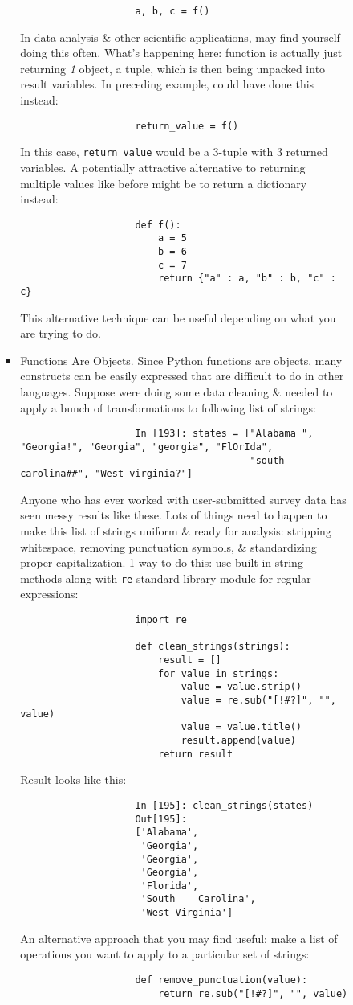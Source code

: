 \documentclass{article}
\begin{document}
\begin{enumerate}
\begin{itemize}
\begin{itemize}
\begin{itemize}
\begin{verbatim}
					a, b, c = f()
				\end{verbatim}
				In data analysis \& other scientific applications, may find yourself doing this often. What's happening here: function is actually just returning {\it1} object, a tuple, which is then being unpacked into result variables. In preceding example, could have done this instead:
				\begin{verbatim}
					return_value = f()
				\end{verbatim}
				In this case, \verb|return_value| would be a 3-tuple with 3 returned variables. A potentially attractive alternative to returning multiple values like before might be to return a dictionary instead:
				\begin{verbatim}
					def f():
					    a = 5
					    b = 6
					    c = 7
					    return {"a" : a, "b" : b, "c" : c}
				\end{verbatim}
				This alternative technique can be useful depending on what you are trying to do.
				\item {\sf Functions Are Objects.} Since Python functions are objects, many constructs can be easily expressed that are difficult to do in other languages. Suppose were doing some data cleaning \& needed to apply a bunch of transformations to following list of strings:
				\begin{verbatim}
					In [193]: states = ["Alabama ", "Georgia!", "Georgia", "georgia", "FlOrIda",
					                    "south carolina##", "West virginia?"]
				\end{verbatim}
				Anyone who has ever worked with user-submitted survey data has seen messy results like these. Lots of things need to happen to make this list of strings uniform \& ready for analysis: stripping whitespace, removing punctuation symbols, \& standardizing proper capitalization. 1 way to do this: use built-in string methods along with {\tt re} standard library module for regular expressions:
				\begin{verbatim}
					import re
					
					def clean_strings(strings):
					    result = []
					    for value in strings:
					        value = value.strip()
					        value = re.sub("[!#?]", "", value)
					        value = value.title()
					        result.append(value)
					    return result
				\end{verbatim}
				Result looks like this:
				\begin{verbatim}
					In [195]: clean_strings(states)
					Out[195]:
					['Alabama',
					 'Georgia',
					 'Georgia',
					 'Georgia',
					 'Florida',
					 'South    Carolina',
					 'West Virginia']
				\end{verbatim}
				An alternative approach that you may find useful: make a list of operations you want to apply to a particular set of strings:
				\begin{verbatim}
					def remove_punctuation(value):
					    return re.sub("[!#?]", "", value)
					    

\end{verbatim}
\end{itemize}
\end{itemize}
\end{itemize}
\end{enumerate}
\end{document}
